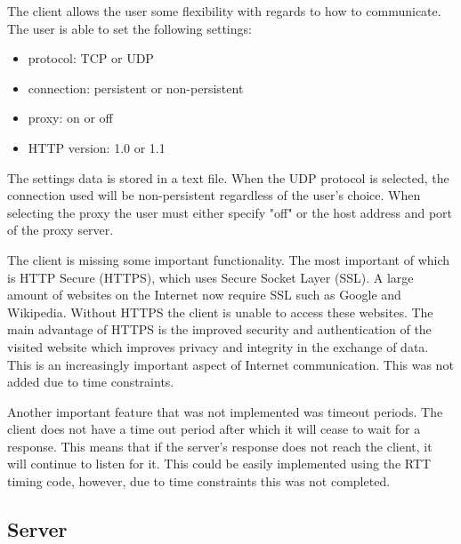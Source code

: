 \documentclass[10pt,twocolumn]{witseiepaper}
\begin{document}
	The client allows the user some flexibility with regards to how to communicate. The user is able to set the following settings:

	\begin{itemize}
		\item protocol: TCP or UDP
		\item connection: persistent or non-persistent
		\item proxy: on or off
		\item HTTP version: 1.0 or 1.1
	\end{itemize}

	The settings data is stored in a text file. When the UDP protocol is selected, the connection used will be non-persistent regardless of the user's choice. When selecting the proxy the user must either specify "off" or the host address and port of the proxy server.

	The client is missing some important functionality. The most important of which is HTTP Secure (HTTPS), which uses Secure Socket Layer (SSL). A large amount of websites on the Internet now require SSL such as Google and Wikipedia. Without HTTPS the client is unable to access these websites. The main advantage of HTTPS is the improved security and authentication of the visited website which improves privacy and integrity in the exchange of data. This is an increasingly important aspect of Internet communication. This was not added due to time constraints.

	Another important feature that was not implemented was timeout periods. The client does not have a time out period after which it will cease to wait for a response. This means that if the server's response does not reach the client, it will continue to listen for it. This could be easily implemented using the RTT timing code, however, due to time constraints this was not completed.

	\subsection{Server}
\end{document}
